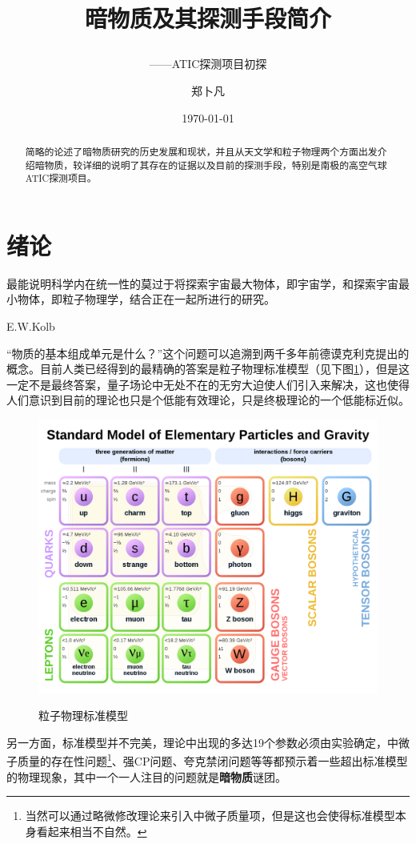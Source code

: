 \documentclass{ctexart}
\title{暗物质及其探测手段简介\\ \subtitle{——ATIC探测项目初探}  } %
\author{郑卜凡\quad2021302022016}                     %
\date{\today}                             %
\newcommand{\dotemph}[1]{\CJKunderdot{#1}}
\begin{document}
    \maketitle              %
    \begin{abstract}
        简略的论述了暗物质研究的历史发展和现状，并且从天文学和粒子物理两个方面出发介绍暗物质，较详细的说明了其存在的证据以及目前的探测手段，特别是南极的高空气球ATIC探测项目。
    \end{abstract}
    \tableofcontents        %
	
	\newpage
	\section{绪论}
	\setlength{\epigraphwidth}{.7\textwidth}
	\epigraph{最能说明科学内在统一性的莫过于将探索宇宙最大物体，即宇宙学，和探索宇宙最小物体，即粒子物理学，结合正在一起所进行的研究。}{E.W.Kolb}
	“物质的基本组成单元是什么？”这个问题可以追溯到两千多年前德谟克利克提出\dotemph{原子}的概念。目前人类已经得到的最精确的答案是粒子物理标准模型（见下图\ref{fig:1}），但是这一定不是最终答案，量子场论中无处不在的无穷大迫使人们引入\dotemph{重整化}来解决，这也使得人们意识到目前的理论也只是个低能有效理论，只是终极理论的一个低能标近似。\cite{AZ}
	
	\begin{figure}[h]
		\centering
		\includegraphics[width=0.618\linewidth]{figs/Standard_Model_of_Elementary_Particles.png}
		\label{fig:1}
		\caption{粒子物理标准模型}
	\end{figure}
	
	另一方面，标准模型并不完美，理论中出现的多达19个参数必须由实验确定，中微子质量的存在性问题\footnote{当然可以通过略微修改理论来引入中微子质量项，但是这也会使得标准模型本身看起来相当不自然。\cite{PFS}}、强CP问题、夸克禁闭问题等等都预示着一些超出标准模型的物理现象，其中一个一人注目的问题就是\textbf{暗物质}谜团。
	
\end{document}
